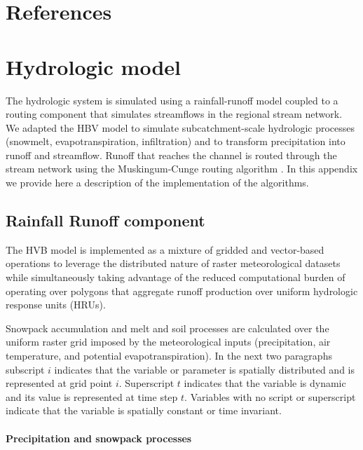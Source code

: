 \documentclass[review]{elsarticle}
\begin{document}
\section*{References}



\appendix
\section{Hydrologic model}
\label{app:hydrologic_model}

The hydrologic system is simulated using a rainfall-runoff model coupled to a routing component that simulates streamflows in the regional stream network. We adapted the HBV model \citep{Bergstrom1995, Bergstrom1973} to simulate subcatchment-scale hydrologic processes (snowmelt, evapotranspiration, infiltration) and to transform precipitation into runoff and streamflow. Runoff that reaches the channel is routed through the stream network using the Muskingum-Cunge routing algorithm \cite{Chow1988}. In this appendix we provide here a description of the implementation of the algorithms.

\subsection{Rainfall Runoff component}

The HVB model \citep{Bergstrom1995, Bergstrom1973} is implemented as a mixture of gridded and vector-based operations to leverage the distributed nature of raster meteorological datasets while simultaneously taking advantage of the reduced computational burden of operating over polygons that aggregate runoff production over uniform hydrologic response units (HRUs). 

Snowpack accumulation and melt and soil processes are calculated over the uniform raster grid imposed by the meteorological inputs (precipitation, air temperature, and potential evapotranspiration). In the next two paragraphs subscript $i$ indicates that the variable or parameter is spatially distributed and is represented at grid point $i$. Superscript $t$ indicates that the variable is dynamic and its value is represented at time step $t$. Variables with no script or superscript indicate that the variable is spatially constant or time invariant. 

\paragraph{Precipitation and snowpack processes}      
\end{document}
